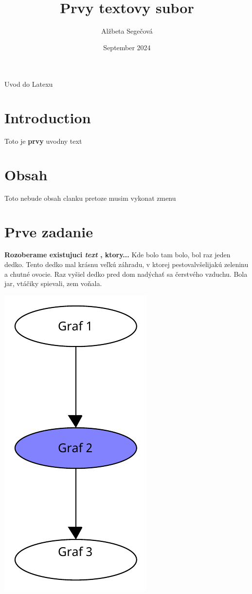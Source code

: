 \documentclass[10pt,twocolumn,twoside,slovak,a4paper]{article}
\title{Prvy textovy subor}
\author{Alžbeta Segečová}
\date{September 2024}
\begin{document}
\maketitle
Uvod do Latexu


\section{Introduction}
Toto je \textbf{prvy} uvodny text 

\section{Obsah}
Toto nebude obsah clanku pretoze musim vykonat zmenu


\section{Prve zadanie}
\textbf{Rozoberame existujuci \emph{text} , ktory... }
Kde bolo tam bolo, bol raz jeden dedko. Tento dedko mal krásnu veľkú záhradu, v ktorej pestovalvšelijakú zeleninu a chutné ovocie. Raz vyšiel dedko pred dom nadýchať sa čerstvého vzduchu. Bola jar, vtáčiky spievali, zem voňala.

\includegraphics[width =10 cm]{diagram.pdf}
\end{document}
